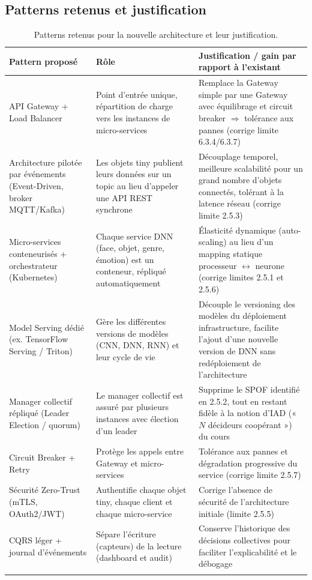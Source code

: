 \documentclass[11pt,a4paper]{article}
\begin{document}
\subsection{Patterns retenus et justification}
\renewcommand{\arraystretch}{1.25}
\begin{longtable}{|>{\raggedright\arraybackslash}p{3.1cm}|
                  >{\raggedright\arraybackslash}p{4.6cm}|
                  >{\raggedright\arraybackslash}p{6.1cm}|}
\hline
\textbf{Pattern proposé} & \textbf{Rôle} & \textbf{Justification / gain par rapport à l'existant} \\
\hline
\endhead
API Gateway + Load Balancer & Point d'entrée unique, répartition de charge vers les instances de micro-services & Remplace la Gateway simple par une Gateway avec équilibrage et circuit breaker $\Rightarrow$ tolérance aux pannes (corrige limite 6.3.4/6.3.7) \\ \hline
Architecture pilotée par événements (Event-Driven, broker MQTT/Kafka) & Les objets tiny publient leurs données sur un topic au lieu d'appeler une API REST synchrone & Découplage temporel, meilleure scalabilité pour un grand nombre d'objets connectés, tolérant à la latence réseau (corrige limite 2.5.3) \\ \hline
Micro-services conteneurisés + orchestrateur (Kubernetes) & Chaque service DNN (face, objet, genre, émotion) est un conteneur, répliqué automatiquement & Élasticité dynamique (auto-scaling) au lieu d'un mapping statique processeur $\leftrightarrow$ neurone (corrige limites 2.5.1 et 2.5.6) \\ \hline
Model Serving dédié (ex. TensorFlow Serving / Triton) & Gère les différentes versions de modèles (CNN, DNN, RNN) et leur cycle de vie & Découple le versioning des modèles du déploiement infrastructure, facilite l'ajout d'une nouvelle version de DNN sans redéploiement de l'architecture \\ \hline
Manager collectif répliqué (Leader Election / quorum) & Le manager collectif est assuré par plusieurs instances avec élection d'un leader & Supprime le SPOF identifié en 2.5.2, tout en restant fidèle à la notion d'IAD (« $N$ décideurs coopérant ») du cours \\ \hline
Circuit Breaker + Retry & Protège les appels entre Gateway et micro-services & Tolérance aux pannes et dégradation progressive du service (corrige limite 2.5.7) \\ \hline
Sécurité Zero-Trust (mTLS, OAuth2/JWT) & Authentifie chaque objet tiny, chaque client et chaque micro-service & Corrige l'absence de sécurité de l'architecture initiale (limite 2.5.5) \\ \hline
CQRS léger + journal d'événements & Sépare l'écriture (capteurs) de la lecture (dashboard et audit) & Conserve l'historique des décisions collectives pour faciliter l'explicabilité et le débogage \\ \hline
\caption{Patterns retenus pour la nouvelle architecture et leur justification.}
\end{longtable}
\renewcommand{\arraystretch}{1}
\end{document}
